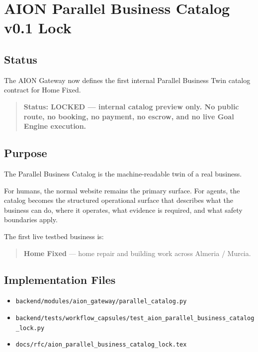 \section{AION Parallel Business Catalog v0.1 Lock}
\label{sec:aion-parallel-business-catalog-lock}

\subsection{Status}

The AION Gateway now defines the first internal Parallel Business Twin catalog contract for Home Fixed.

\begin{quote}
\textbf{Status: LOCKED --- internal catalog preview only. No public route, no booking, no payment, no escrow, and no live Goal Engine execution.}
\end{quote}

\subsection{Purpose}

The Parallel Business Catalog is the machine-readable twin of a real business.

For humans, the normal website remains the primary surface. For agents, the catalog becomes the structured operational surface that describes what the business can do, where it operates, what evidence is required, and what safety boundaries apply.

The first live testbed business is:

\begin{quote}
\textbf{Home Fixed} --- home repair and building work across Almeria / Murcia.
\end{quote}

\subsection{Implementation Files}

\begin{itemize}
  \item \texttt{backend/modules/aion\_gateway/parallel\_catalog.py}
  \item \texttt{backend/tests/workflow\_capsules/test\_aion\_parallel\_business\_catalog\_lock.py}
  \item \texttt{docs/rfc/aion\_parallel\_business\_catalog\_lock.tex}
\end{itemize}

